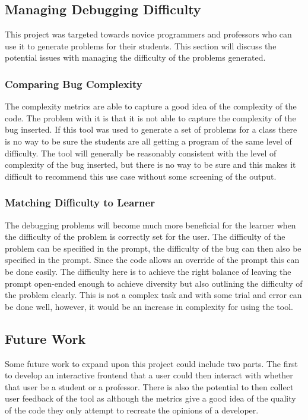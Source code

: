 \documentclass[12pt]{extarticle}
\begin{document}
\subsection{Managing Debugging Difficulty}

This project was targeted towards novice programmers and professors who can use it to generate problems for their students. This section will discuss the potential issues with managing the difficulty of the problems generated.

\subsubsection{Comparing Bug Complexity}

The complexity metrics are able to capture a good idea of the complexity of the code. The problem with it is that it is not able to capture the complexity of the bug inserted. If this tool was used to generate a set of problems for a class there is no way to be sure the students are all getting a program of the same level of difficulty. The tool will generally be reasonably consistent with the level of complexity of the bug inserted, but there is no way to be sure and this makes it difficult to recommend this use case without some screening of the output.

\subsubsection{Matching Difficulty to Learner}

The debugging problems will become much more beneficial for the learner when the difficulty of the problem is correctly set for the user. The difficulty of the problem can be specified in the prompt, the difficulty of the bug can then also be specified in the prompt. Since the code allows an override of the prompt this can be done easily. The difficulty here is to achieve the right balance of leaving the prompt open-ended enough to achieve diversity but also outlining the difficulty of the problem clearly. This is not a complex task and with some trial and error can be done well, however, it would be an increase in complexity for using the tool.

\subsection{Future Work}

Some future work to expand upon this project could include two parts. The first to develop an interactive frontend that a user could then interact with whether that user be a student or a professor. There is also the potential to then collect user feedback of the tool as although the metrics give a good idea of the quality of the code they only attempt to recreate the opinions of a developer.
\end{document}
